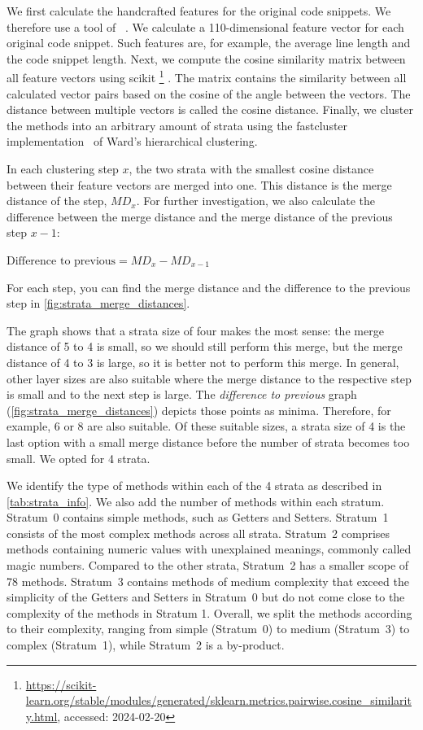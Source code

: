 \documentclass[%
class=scrreprt,
chapterprefix=false,%
open=right,%
twoside=true,%
paper=a4,%
logofile={Logo\_zentral\_farbig\_EN.png},%
thesistype=master,%
UKenglish,%
]{se2thesis}
\newcounter{urlfootnote}
\newcommand{\onecurl}[2]{%
	\stepcounter{urlfootnote}%
	\expandafter\def\csname urlfootnote:#1\endcsname{\theurlfootnote}%
	\footnote{\label{url:#1}\url{#1}, accessed: #2}%
}
\newcommand{\curl}[2]{%
		\onecurl{#1}{#2}%
}
\theoremstyle{definition}
\begin{document}
	We first calculate the handcrafted features for the original code snippets. We therefore use a tool of \citeauthor{scalabrino2018comprehensive}~\cite{scalabrino2018comprehensive}. We calculate a 110-dimensional feature vector for each original code snippet.
    Such features are, for example, the average line length and the code snippet length.
    Next, we compute the cosine similarity matrix between all feature vectors using scikit\curl{https://scikit-learn.org/stable/modules/generated/sklearn.metrics.pairwise.cosine_similarity.html}{2024-02-20}.
    The matrix contains the similarity between all calculated vector pairs based on the cosine of the angle between the vectors. The distance between multiple vectors is called the cosine distance.
    Finally, we cluster the methods into an arbitrary amount of strata using the fastcluster implementation~\cite{mullner2013fastcluster} of Ward's hierarchical clustering.
	
	In each clustering step $x$, the two strata with the smallest cosine distance between their feature vectors are merged into one. This distance is the merge distance of the step, $MD_x$.
    For further investigation, we also calculate the difference between the merge distance and the merge distance of the previous step $x-1$:
    \begin{center}
        $\text{Difference to previous} = MD_x - MD_{x-1}$
    \end{center}
    For each step, you can find the merge distance and the difference to the previous step in \autoref{fig:strata_merge_distances}.
	
	The graph shows that a strata size of four makes the most sense: the merge distance of 5 to 4 is small, so we should still perform this merge, but the merge distance of 4 to 3 is large, so it is better not to perform this merge.
    In general, other layer sizes are also suitable where the merge distance to the respective step is small and to the next step is large. The \textit{difference to previous} graph (\autoref{fig:strata_merge_distances}) depicts those points as minima. Therefore, for example, 6 or 8 are also suitable.
    Of these suitable sizes, a strata size of 4 is the last option with a small merge distance before the number of strata becomes too small.
    We opted for 4 strata.
	
	We identify the type of methods within each of the 4 strata as described in \autoref{tab:strata_info}. We also add the number of methods within each stratum. 
    Stratum~0 contains simple methods, such as Getters and Setters. Stratum~1 consists of the most complex methods across all strata. 
    Stratum~2 comprises methods containing numeric values with unexplained meanings, commonly called magic numbers. Compared to the other strata, Stratum~2 has a smaller scope of 78 methods. 
    Stratum~3 contains methods of medium complexity that exceed the simplicity of the Getters and Setters in Stratum~0 but do not come close to the complexity of the methods in Stratum 1. 
    Overall, we split the methods according to their complexity, ranging from simple (Stratum~0) to medium (Stratum~3) to complex (Stratum~1), while Stratum~2 is a by-product.
	
\end{document}
